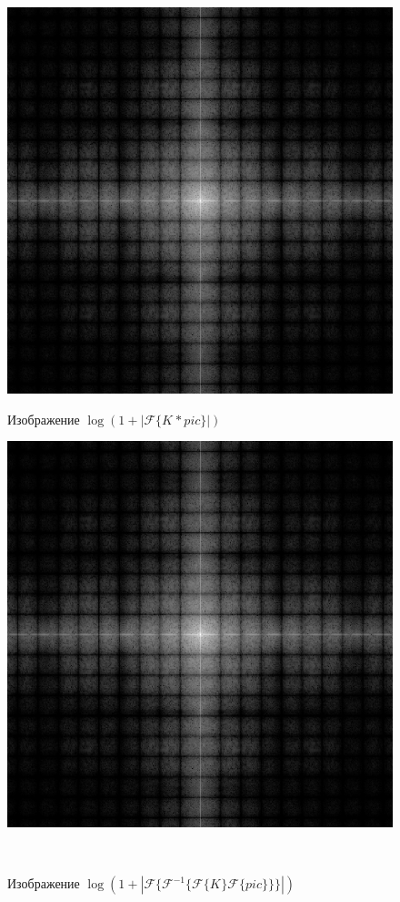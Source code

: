 \documentclass[a4paper]{article}
\begin{document}
\begin{figure}[H]
    \begin{minipage}{0.49\textwidth}
        \centering \includegraphics[width=\textwidth]{2/19_abs_fourier_log_norm_img_block.png}
        \caption{Изображение $\log{(1+|\mathcal{F}\{K_{\boxed{}}*pic\}|)}$}
    \end{minipage}\hfill
    \begin{minipage}{0.49\textwidth}
        \centering \includegraphics[width=\textwidth]{2/19_abs_fourier_log_norm_img_block1.png}
        \caption{Изображение $\log{(1+|\mathcal{F}\{\mathcal{F}^{-1}\{ \mathcal{F}\{K_{\boxed{}}\}\mathcal{F}\{pic\}\}\}|)}$}
    \end{minipage}\\[1em]
\end{figure}\noindent\
\end{document}
